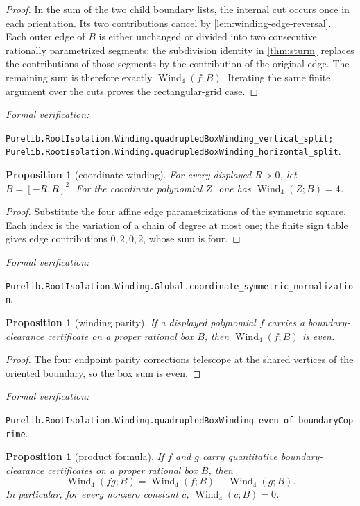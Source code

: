 \documentclass[11pt]{article}
\newtheorem{proposition}[theorem]{Proposition}
\newcommand{\Wind}{\operatorname{Wind}}
\newcommand{\leanref}[1]{\par\smallskip\noindent
  \emph{Formal verification:}\par\nobreak
  {\raggedright\nolinkurl{#1}.\par}}
\begin{document}
\begin{proof}
In the sum of the two child boundary lists, the internal cut occurs once in
each orientation.  Its two contributions cancel by
\cref{lem:winding-edge-reversal}.  Each outer edge of $B$ is either unchanged
or divided into two consecutive rationally parametrized segments; the
subdivision identity in \cref{thm:sturm} replaces the contributions of those
segments by the contribution of the original edge.  The remaining sum is
therefore exactly $\Wind_4(f;B)$.  Iterating the same finite argument over
the cuts proves the rectangular-grid case.
\end{proof}

\leanref{Purelib.RootIsolation.Winding.quadrupledBoxWinding_vertical_split;
Purelib.RootIsolation.Winding.quadrupledBoxWinding_horizontal_split}

\begin{proposition}[coordinate winding]
\label{prop:coordinate-normalization}
For every displayed $R>0$, let $B=[-R,R]^2$.  For the coordinate polynomial
$Z$, one has $\Wind_4(Z;B)=4$.
\end{proposition}

\begin{proof}
Substitute the four affine edge parametrizations of the symmetric square.
Each index is the variation of a chain of degree at most one; the finite sign
table gives edge contributions $0,2,0,2$, whose sum is four.
\end{proof}

\leanref{Purelib.RootIsolation.Winding.Global.coordinate_symmetric_normalization}

\begin{proposition}[winding parity]
\label{prop:parity}
If a displayed polynomial $f$ carries a boundary-clearance certificate on a
proper rational box $B$, then $\Wind_4(f;B)$ is even.
\end{proposition}

\begin{proof}
The four endpoint parity corrections telescope at the shared vertices of
the oriented boundary, so the box sum is even.
\end{proof}

\leanref{Purelib.RootIsolation.Winding.quadrupledBoxWinding_even_of_boundaryCoprime}

\begin{proposition}[product formula]
\label{prop:product}
If $f$ and $g$ carry quantitative boundary-clearance certificates on a
proper rational box $B$, then
\[
       \Wind_4(fg;B)=\Wind_4(f;B)+\Wind_4(g;B).
\]
In particular, for every nonzero constant $c$,
$\Wind_4(c;B)=0$.
\end{proposition}
\end{document}
